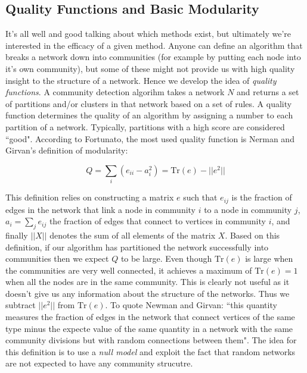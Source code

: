 \subsection{Quality Functions and Basic Modularity}
It's all well and good talking about which methods exist, but ultimately we're interested in the efficacy of a given method. Anyone can define an algorithm that breaks a network down into communities (for example by putting each node into it's own community), but some of these might not provide us with high quality insight to the structure of a network. Hence we develop the idea of \emph{quality functions}. A community detection algorihm takes a network $N$ and returns a set of partitions and/or clusters in that network based on a set of rules. A quality function determines the quality of an algorithm by assigning a number to each partition of a network. Typically, partitions with a high score are considered ``good". According to Fortunato, the most used quality function is Nerman and Girvan's definition of modularity\cite[8]{newman_girvan}:

$$ Q = \sum_i (e_{ii} - a_i^2) = \text{Tr}(e) - ||e^2|| $$

This definition relies on constructing a matrix $e$ such that $e_{ij}$ is the fraction of edges in the network that link a node in community $i$ to a node in community $j$, $a_i = \sum_j e_{ij}$ the fraction of edges that connect to vertices in community $i$, and finally $||X||$ denotes the sum of all elements of the matrix $X$. Based on this definition, if our algorithm has partitioned the network successfully into communities then we expect $Q$ to be large. Even though $\text{Tr}(e)$ is large when the communities are very well connected, it achieves a maximum of $\text{Tr}(e) = 1$ when all the nodes are in the same community. This is clearly not useful as it doesn't give us any information about the structure of the networks. Thus we subtract $||e^2||$ from $\text{Tr}(e)$. To quote Newman and Girvan: ``this quantity measures the fraction of edges in the network that connect vertices of the same type minus the expecte value of the same quantity in a network with the same community divisions but with random connections between them". The idea for this definition is to use a \emph{null model} and exploit the fact that random networks are not expected to have any community strucutre.


